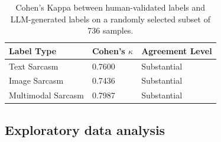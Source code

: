 \documentclass[conference]{IEEEtran}
\begin{document}
\begin{table}[t]
\centering
\footnotesize
\setlength{\tabcolsep}{3pt}
\begin{tabular}{lll}          %
\toprule
\textbf{Label Type} & \textbf{Cohen's $\kappa$} & \textbf{Agreement Level} \\
\midrule
Text Sarcasm        & 0.7600 & Substantial \\
Image Sarcasm       & 0.7436 & Substantial \\
Multimodal Sarcasm  & 0.7987 & Substantial \\
\bottomrule
\end{tabular}
\caption{Cohen's Kappa between human-validated labels and LLM-generated labels on a randomly selected subset of 736 samples.}
\label{tab:human_llm_agreement}
\end{table}
\subsection{Exploratory data analysis}
\end{document}
